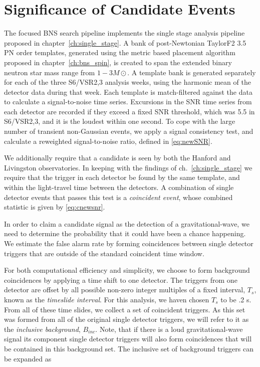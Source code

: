 \section{Significance of Candidate Events}
\label{sec:pipeline}

The focused BNS search pipeline implements the single stage analysis pipeline proposed in chapter~\ref{ch:single_stage}. A bank of post-Newtonian TaylorF2 3.5 PN order templates, generated using the metric based placement algorithm proposed in chapter~\ref{ch:bns_spin}, is created to span the extended binary neutron star mass range from $1-3 M\odot$. A template bank is generated separately for each of the three S6/VSR2,3 analysis weeks, using the harmonic mean of the detector data during that week. Each template is match-filtered against the data to calculate a signal-to-noise time series. Excursions in the SNR time series from each detector are recorded if they exceed a fixed SNR threshold, which was 5.5 in S6/VSR2,3, and it is the loudest within one second. To cope with the large number of transient non-Gaussian events, we apply a signal consistency test, and calculate a reweighted signal-to-noise ratio, defined in \ref{eq:newSNR}.

We additionally require that a candidate is seen by both the Hanford and Livingston observatories. In keeping with the findings of ch.~\ref{ch:single_stage} we require that the trigger in each detector be found by the same template, and within the light-travel time between the detectors. A combination of single detector events that passes this test is a \emph{coincident event}, whose combined statistic is given by \ref{eq:cnewsnr}.

In order to claim a candidate signal as the detection of a gravitational-wave, we need to determine the probability that it could have been a chance happening. We estimate the false alarm rate by forming coincidences between single detector triggers that are outside of the standard coincident time window. 

For both computational efficiency and simplicity, we choose to form background coincidences by applying a time shift to one detector. The triggers from one detector are offset by all possible non-zero integer multiples of a fixed interval, $T_s$, known as the \emph{timeslide interval}. For this analysis, we haven chosen $T_s$ to be .2 s. From all of these time slides, we collect a set of coincident triggers. As this set was formed from all of the original single detector triggers, we will refer to it as the \textit{inclusive background}, $B_{inc}$. Note, that if there is a loud gravitational-wave signal its component single detector triggers will also form coincidences that will be contained in this background set. The inclusive set of background triggers can be expanded as

